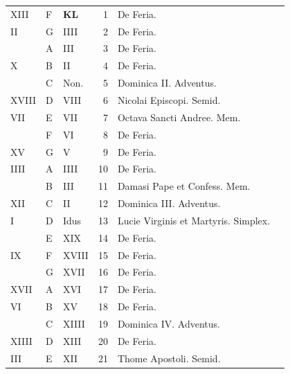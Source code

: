 \begin{center}
\begin{tabular}{l | l | l | r | l l}
\color{Red} XIII & F & \textbf{\color{Red} K\color{Blue}L} & 1 & De Feria. \\
\color{Red} II & G & \color{Red} IIII & 2 & De Feria. \\
\color{Red}  & \color{Red} A & \color{Red} III & 3 & De Feria. & \color{Red} \\
\color{Red} X & B & \color{Red} II & 4 & De Feria. & \color{Red} \\
\color{Red}  & C & \color{Red} Non. & 5 & \color{Red} Dominica II. Adventus. & \color{Red} \\
\color{Red} XVIII & D & \color{Red} VIII & 6 & \color{Red} Nicolai Episcopi. Semid. & \color{Red} \\
\color{Red} VII & E & \color{Red} VII & 7 & \color{Red} Octava Sancti Andree. Mem. \\
\color{Red}  & F & \color{Red} VI & 8 & De Feria. & \color{Red} \\
\color{Red} XV & G & \color{Red} V & 9 & De Feria.  & \color{Red} \\
\color{Red} IIII & \color{Red} A & \color{Red} IIII & 10 & De Feria.  & \color{Red} \\
\color{Red}  & B & \color{Red} III & 11 & Damasi Pape et Confess. Mem. & \color{Red} \\
\color{Red} XII & C & \color{Red} II & 12 & \color{Red} Dominica III. Adventus.  & \color{Red} \\
\color{Red} I & D & \color{Red} Idus & 13 & Lucie Virginis et Martyris. Simplex. & \color{Red} \\
\color{Red}  & E & \color{Red} XIX & 14 & De Feria.  & \color{Red} \\
\color{Red} IX & F & \color{Red} XVIII & 15 & De Feria. \\
\color{Red}  & G & \color{Red} XVII & 16 & De Feria. & \color{Red} \\
\color{Red} XVII & \color{Red} A & \color{Red} XVI & 17 & De Feria. \\%
\color{Red} VI & B & \color{Red} XV & 18 & De Feria. \\
\color{Red}  & C & \color{Red} XIIII & 19 & \color{Red} Dominica IV. Adventus. & \color{Red} \\
\color{Red} XIIII & D & \color{Red} XIII & 20 & De Feria. & \color{Red} \\
\color{Red} III & E & \color{Red} XII & 21 & Thome Apostoli. Semid. & \color{Red} \\

\end{tabular}
\end{center}
